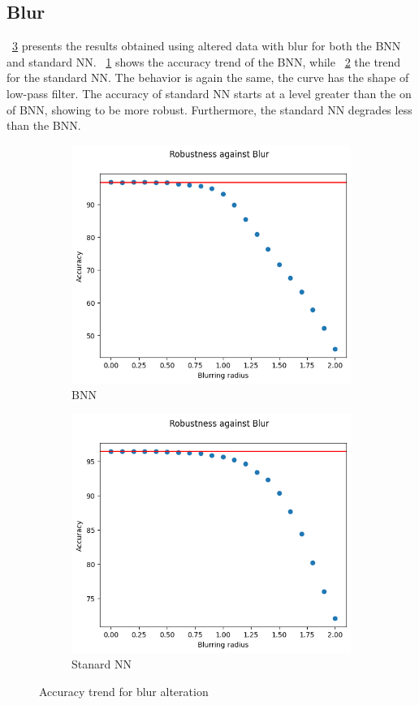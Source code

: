 \subsection{Blur}

\Fig~\ref{fig:acc_bl_wu} presents the results obtained using altered data with blur for both the BNN and standard NN. \Fig~\ref{fig:bl_acc_wu_bnn} shows the accuracy trend of the BNN, while \Fig~\ref{fig:blur_ann} the trend for the standard NN. The behavior is again the same, the curve has the shape of low-pass filter. The accuracy of standard NN starts at a level greater than the on of BNN, showing to be more robust. Furthermore, the standard NN degrades less than the BNN.

\begin{figure}[h]
	\centering
	\begin{subfigure}{.5\textwidth}
		\centering
		\includegraphics[width=0.9\linewidth]{ImageFiles/EvalBNN/BL/WU/acc}
		\caption{BNN}
		\label{fig:bl_acc_wu_bnn}
	\end{subfigure}%
	\begin{subfigure}{.5\textwidth}
		\centering
		\includegraphics[width=0.9\linewidth]{ImageFiles/EvalANN/blur_ann}
		\caption{Stanard NN}
		\label{fig:blur_ann}
	\end{subfigure}
	\caption{Accuracy trend for blur alteration}
	\label{fig:acc_bl_wu}
\end{figure}

